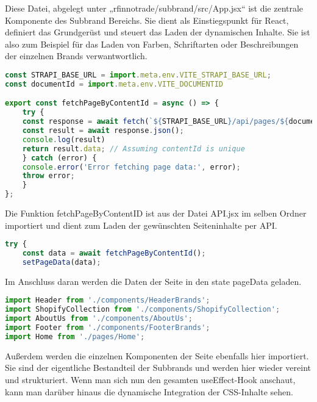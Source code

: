 Diese Datei, abgelegt unter „rfinnotrade/subbrand/src/App.jsx“ ist die zentrale Komponente des Subbrand Bereichs. Sie dient als Einstiegspunkt für React, definiert das Grundgerüst und steuert das Laden der dynamischen Inhalte. Sie ist also zum Beispiel für das Laden von Farben, Schriftarten oder Beschreibungen der einzelnen Brands verwantwortlich.

\begin{lstlisting}[language=JavaScript, caption={API.jsx}, label={lst:apijsx}]
const STRAPI_BASE_URL = import.meta.env.VITE_STRAPI_BASE_URL;
const documentId = import.meta.env.VITE_DOCUMENTID

export const fetchPageByContentId = async () => {
    try {
    const response = await fetch(`${STRAPI_BASE_URL}/api/pages/${documentId}?populate=*`);
    const result = await response.json();
    console.log(result)
    return result.data; // Assuming contentId is unique
    } catch (error) {
    console.error('Error fetching page data:', error);
    throw error;
    }
};
\end{lstlisting}

Die Funktion fetchPageByContentID ist aus der Datei API.jsx im selben Ordner importiert und dient zum Laden der gewünschten Seiteninhalte per API.

\begin{lstlisting}[language=JavaScript, caption={App.jsx state}, label={lst:appjsxState}]
try {
    const data = await fetchPageByContentId();
    setPageData(data);
\end{lstlisting}

Im Anschluss daran werden die Daten der Seite in den state pageData geladen.

\begin{lstlisting}[language=JavaScript, caption={App.jsx Imports}, label={lst:appjsxImports}]
import Header from './components/HeaderBrands';
import ShopifyCollection from './components/ShopifyCollection';
import AboutUs from './components/AboutUs';
import Footer from './components/FooterBrands';
import Home from './pages/Home';    
\end{lstlisting}

Außerdem werden die einzelnen Komponenten der Seite ebenfalls hier importiert. Sie sind der eigentliche Bestandteil der Subbrands und werden hier wieder vereint und strukturiert. Wenn man sich nun den gesamten useEffect-Hook anschaut, kann man darüber hinaus die dynamische Integration der CSS-Inhalte sehen.


